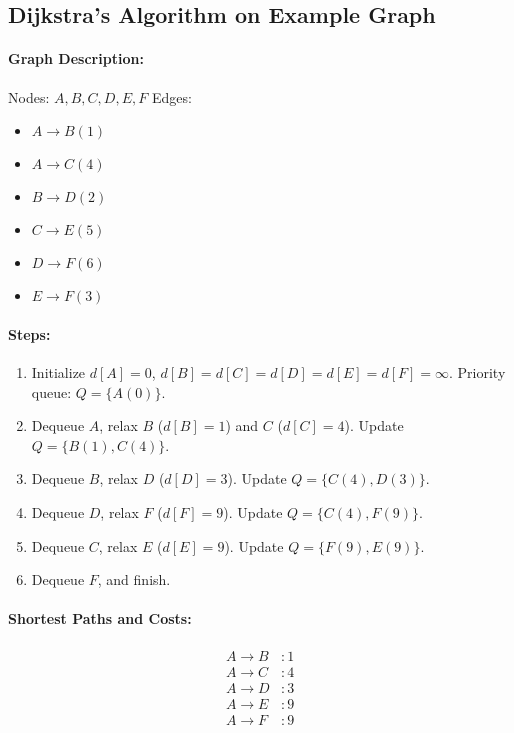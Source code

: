 \documentclass{article}
\begin{document}
\subsection*{Dijkstra’s Algorithm on Example Graph}
\paragraph{Graph Description:}
Nodes: \( A, B, C, D, E, F \)  
Edges:
\begin{itemize}
    \item \( A \to B (1) \)
    \item \( A \to C (4) \)
    \item \( B \to D (2) \)
    \item \( C \to E (5) \)
    \item \( D \to F (6) \)
    \item \( E \to F (3) \)
\end{itemize}

\paragraph{Steps:}
\begin{enumerate}
    \item Initialize \( d[A] = 0 \), \( d[B] = d[C] = d[D] = d[E] = d[F] = \infty \). Priority queue: \( Q = \{A (0)\} \).
    \item Dequeue \( A \), relax \( B \) (\( d[B] = 1 \)) and \( C \) (\( d[C] = 4 \)). Update \( Q = \{B (1), C (4)\} \).
    \item Dequeue \( B \), relax \( D \) (\( d[D] = 3 \)). Update \( Q = \{C (4), D (3)\} \).
    \item Dequeue \( D \), relax \( F \) (\( d[F] = 9 \)). Update \( Q = \{C (4), F (9)\} \).
    \item Dequeue \( C \), relax \( E \) (\( d[E] = 9 \)). Update \( Q = \{F (9), E (9)\} \).
    \item Dequeue \( F \), and finish.
\end{enumerate}

\paragraph{Shortest Paths and Costs:}
\[
\begin{aligned}
    A \to B &: 1 \\
    A \to C &: 4 \\
    A \to D &: 3 \\
    A \to E &: 9 \\
    A \to F &: 9
\end{aligned}
\]
\end{document}
